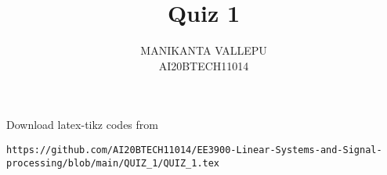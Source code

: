 \documentclass[journal,12pt,twocolumn]{IEEEtran}
\DeclareMathOperator*{\Res}{Res}
\begin{document}
\newcommand{\BEQA}{\begin{eqnarray}}
\newcommand{\EEQA}{\end{eqnarray}}
\newcommand{\define}{\stackrel{\triangle}{=}}

\raggedbottom
\setlength{\parindent}{0pt}
\providecommand{\mbf}{\mathbf}
\providecommand{\pr}[1]{\ensuremath{\Pr\left(#1\right)}}
\providecommand{\qfunc}[1]{\ensuremath{Q\left(#1\right)}}
\providecommand{\sbrak}[1]{\ensuremath{{}\left[#1\right]}}
\providecommand{\lsbrak}[1]{\ensuremath{{}\left[#1\right.}}
\providecommand{\rsbrak}[1]{\ensuremath{{}\left.#1\right]}}
\providecommand{\brak}[1]{\ensuremath{\left(#1\right)}}
\providecommand{\lbrak}[1]{\ensuremath{\left(#1\right.}}
\providecommand{\rbrak}[1]{\ensuremath{\left.#1\right)}}
\providecommand{\cbrak}[1]{\ensuremath{\left\{#1\right\}}}
\providecommand{\lcbrak}[1]{\ensuremath{\left\{#1\right.}}
\providecommand{\rcbrak}[1]{\ensuremath{\left.#1\right\}}}
\theoremstyle{remark}
\newtheorem{rem}{Remark}
\newcommand{\sgn}{\mathop{\mathrm{sgn}}}
\providecommand{\abs}[1]{\vert#1\vert}
\providecommand{\res}[1]{\Res\displaylimits_{#1}} 
\providecommand{\norm}[1]{\lVert#1\rVert}
\providecommand{\mtx}[1]{\mathbf{#1}}
\providecommand{\mean}[1]{E[ #1 ]}
\providecommand{\fourier}{\overset{\mathcal{F}}{ \rightleftharpoons}}
\providecommand{\system}{\overset{\mathcal{H}}{ \longleftrightarrow}}
\newcommand{\solution}{\noindent \textbf{Solution: }}
\newcommand{\cosec}{\,\text{cosec}\,}
\providecommand{\dec}[2]{\ensuremath{\overset{#1}{\underset{#2}{\gtrless}}}}
\newcommand{\myvec}[1]{\ensuremath{\begin{pmatrix}#1\end{pmatrix}}}
\newcommand{\mydet}[1]{\ensuremath{\begin{vmatrix}#1\end{vmatrix}}}

\makeatletter
{}
\makeatother
\let\StandardTheFigure\thefigure
\let\vec\mathbf
\renewcommand{\thefigure}{\theproblem}
\def\putbox#1#2#3{\makebox[0in][l]{\makebox[#1][l]{}\raisebox{\baselineskip}[0in][0in]{\raisebox{#2}[0in][0in]{#3}}}}
     \def\rightbox#1{\makebox[0in][r]{#1}}
     \def\centbox#1{\makebox[0in]{#1}}
     \def\topbox#1{\raisebox{-\baselineskip}[0in][0in]{#1}}
     \def\midbox#1{\raisebox{-0.5\baselineskip}[0in][0in]{#1}}
\vspace{3cm}
\title{Quiz 1}
\author{MANIKANTA VALLEPU \\ AI20BTECH11014}
\maketitle
\newpage
\bigskip
\renewcommand{\thefigure}{\theenumi}
\renewcommand{\thetable}{\theenumi}
Download latex-tikz codes from 
%
\begin{lstlisting}
https://github.com/AI20BTECH11014/EE3900-Linear-Systems-and-Signal-processing/blob/main/QUIZ_1/QUIZ_1.tex
\end{lstlisting}
\end{document}
